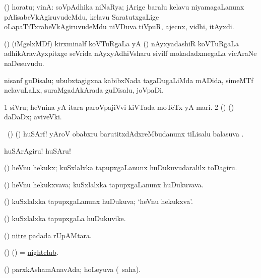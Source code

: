 \bentry
{}
\gl{\gu}
\bmng
(\nAyxshA) horatu; vinA:  soVpAdhika niNaRya; jArige baralu kelavu niyamagaLanunx pAlisabeVkAgiruvudeMdu, kelavu SaratutxgaLige oLapaTiTxrabeVkAgiruvudeMdu niVDuva tiVpuR, ajecnx, vidhi, itAyxdi. 
\emng
\eentry

\bentry
{}
\gl{\nA}
\expl{\Latin}
\bmng
(\nAyxshA) (iMgelxMDf) kirxminalf koVTuRgaLa yA (\ca) nAyxyadashiR koVTuRgaLa adhikAravAyxpitxge seVrida nAyxyAdhiVsharu sivilf mokadadxmegaLa vicAraNe naDesuvudu. 
\emng
\eentry

\bentry
{}
\gl{\nA}
\bmng
nisanf guDisalu; ububxtagigxna kabibxNada tagaDugaLiMda mADida, simeMTf nelavuLaLx, suraMgadAkArada guDisalu, joVpaDi. 
\emng
\eentry

\bentry
{}
\gl{\nA}
\bmng
\bnum
\num{1} siVru; heVnina yA itara paroVpajiVvi kiVTada moTeTx yA mari. 
\num{2} (\birx) (\ashi) daDaDx; aviveVki. 
\enum
\emng
\eentry

\bentry
{}
\bmng
\BAavayx\ (\AseTxrXV) (\ashi) huSArf! yAroV obabxru barutitxdAdxreMbudanunx tiLisalu balasuva \BAavayx. 
\emng

\noindent
\gl{\pagu}
\bmng
{} huSArAgiru! huSAru! 
\emng
\eentry

\bentry
{}
\gl{\akirx}
\bmng
(\AmA) heVnu hekukx; kuSxlalxka tapupxgaLanunx huDukuvudaralilx toDagiru. 
\emng
\eentry

\bentry
{}
\gl{\nA}
\bmng
(\AmA) heVnu hekukxvava; kuSxlalxka tapupxgaLanunx huDukuvava. 
\emng
\eentry

\bentry
{}
\gl{\gu}
\bmng
(\AmA) kuSxlalxka tapupxgaLanunx huDukuva; `heVnu hekukxva'. 
\emng
\eentry

\bentry
{}
\gl{\nA}
\bmng
(\AmA) kuSxlalxka tapupxgaLa huDukuvike. 
\emng
\eentry

\bentry
{}
\gl{\nA}
\bmng
(\ame) \hyperlink{nitre}{nitre} padada rUpAMtara. 
\emng
\eentry

\bentry
{}
\gl{\nA}
\bmng
(\ame) (\AmA) = \hyperlink{nightclub}{nightclub}. 
\emng
\eentry

\bentry
{}
\gl{\gu}
\bmng
(\kAparx) parxkAshamAnavAda; hoLeyuva (\rUpa\ saha). 
\emng
\eentry

